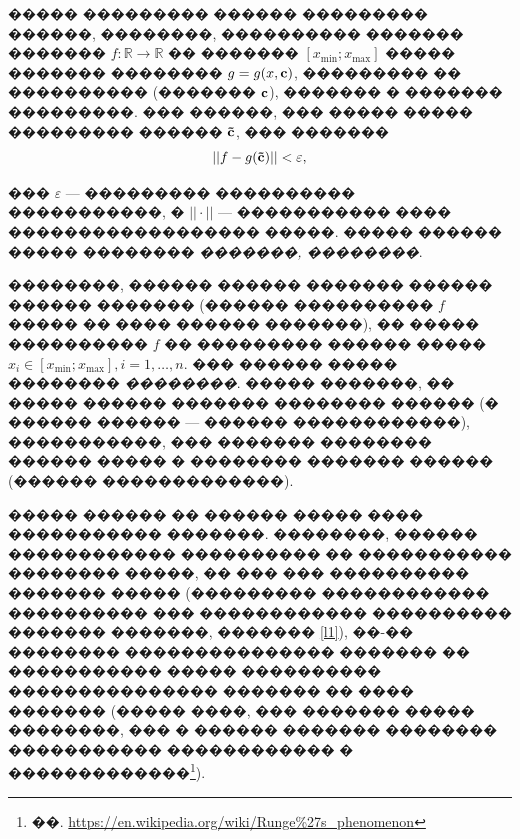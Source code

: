 \documentclass[a4paper]{article}
\begin{document}
����� ��������� ������ ��������� ������, ��������, ���������� ������� ������� $f: \mathbb{R} \rightarrow \mathbb{R}$
�� ������� $[x_{\min};x_{\max}]$ ����� ������� �������� $g=g(x,{\bf c})$, ��������� �� ���������� (������� ${\bf c}$), ������� � ������� ���������.
��� ������, ��� ����� ����� ��������� ������ ${\bf \tilde{c} }$, ��� �������
\begin{equation*}
  ||f-g({\bf \tilde{c}})|| < \varepsilon,
\end{equation*}

��� $\varepsilon$ --- ��������� ���������� �����������, � $||\cdot||$ --- ����������� ���� ������������������ �����.
����� ������ ����� �������� {\it �������, ��������}.

��������, ������ ������ ������� ������ ������ ������� (������ ���������� $f$ ����� �� ���� ������ �������), �� ����� ���������� $f$ �� ��������� ������ ����� $x_i \in [x_{\min};x_{\max}], i=1,\dots,n$.
��� ������ ����� �������� {\it ��������}. ����� �������,
�� ����� ������ ������� �������� ������ (� ������ ������ --- ������ ������������),
�����������, ��� ������� �������� ������ ����� � �������� ������� ������ (������ �������������).

����� ������ �� ������ ����� ���� ����������� �������. ��������, ������ ������������ ���������� �� ����������� �������� �����,
�� ��� ��� ���������� ������� ����� (��������� ������������ ���������� ��� ������������ ���������� ������� �������, ������� \ref{l1}),
��-�� �������� ��������������� ������� �� ����������� ����� ���������� ��������������� ������� �� ���� �������
(����� ����, ��� ������� ����� ��������, ��� � ������ ������� �������� ����������� ������������ � �������������\footnote{��. \url{https://en.wikipedia.org/wiki/Runge\%27s_phenomenon} }).
\end{document}

